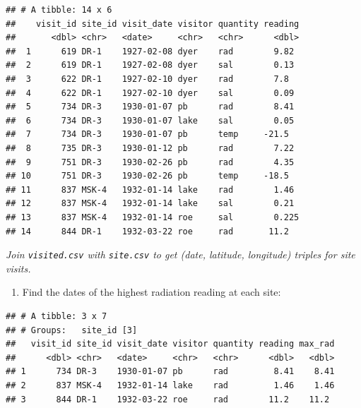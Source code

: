 \documentclass[]{Nemilov}
\newenvironment{Shaded}{\begin{snugshade}}{\end{snugshade}}
\newcommand{\DataTypeTok}[1]{\textcolor[rgb]{0.13,0.29,0.53}{#1}}
\newcommand{\KeywordTok}[1]{\textcolor[rgb]{0.13,0.29,0.53}{\textbf{#1}}}
\newcommand{\NormalTok}[1]{#1}
\newcommand{\OperatorTok}[1]{\textcolor[rgb]{0.81,0.36,0.00}{\textbf{#1}}}
\newcommand{\StringTok}[1]{\textcolor[rgb]{0.31,0.60,0.02}{#1}}
\providecommand{\tightlist}{%
  \setlength{\itemsep}{0pt}\setlength{\parskip}{0pt}}
\begin{document}
\begin{verbatim}
## # A tibble: 14 x 6
##    visit_id site_id visit_date visitor quantity reading
##       <dbl> <chr>   <date>     <chr>   <chr>      <dbl>
##  1      619 DR-1    1927-02-08 dyer    rad        9.82 
##  2      619 DR-1    1927-02-08 dyer    sal        0.13 
##  3      622 DR-1    1927-02-10 dyer    rad        7.8  
##  4      622 DR-1    1927-02-10 dyer    sal        0.09 
##  5      734 DR-3    1930-01-07 pb      rad        8.41 
##  6      734 DR-3    1930-01-07 lake    sal        0.05 
##  7      734 DR-3    1930-01-07 pb      temp     -21.5  
##  8      735 DR-3    1930-01-12 pb      rad        7.22 
##  9      751 DR-3    1930-02-26 pb      rad        4.35 
## 10      751 DR-3    1930-02-26 pb      temp     -18.5  
## 11      837 MSK-4   1932-01-14 lake    rad        1.46 
## 12      837 MSK-4   1932-01-14 lake    sal        0.21 
## 13      837 MSK-4   1932-01-14 roe     sal        0.225
## 14      844 DR-1    1932-03-22 roe     rad       11.2
\end{verbatim}

\emph{Join \texttt{visited.csv} with \texttt{site.csv} to get (date, latitude, longitude) triples for site visits.}

\begin{enumerate}
\def\labelenumi{\arabic{enumi}.}
\setcounter{enumi}{6}
\tightlist
\item
  Find the dates of the highest radiation reading at each site:
\end{enumerate}

\begin{Shaded}
\end{Shaded}

\begin{verbatim}
## # A tibble: 3 x 7
## # Groups:   site_id [3]
##   visit_id site_id visit_date visitor quantity reading max_rad
##      <dbl> <chr>   <date>     <chr>   <chr>      <dbl>   <dbl>
## 1      734 DR-3    1930-01-07 pb      rad         8.41    8.41
## 2      837 MSK-4   1932-01-14 lake    rad         1.46    1.46
## 3      844 DR-1    1932-03-22 roe     rad        11.2    11.2
\end{verbatim}
\end{document}
